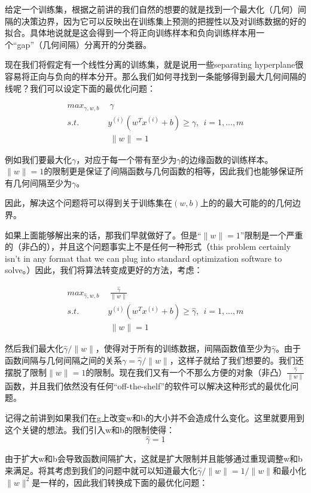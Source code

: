 \documentclass[UTF8]{ctexart}
\begin{document}
给定一个训练集，根据之前讲的我们自然的想要的就是找到一个最大化（几何）间隔的决策边界，因为它可以反映出在训练集上预测的把握性以及对训练数据的好的拟合。具体地说就是这会得到一个将正向训练样本和负向训练样本用一个“gap”（几何间隔）分离开的分类器。

现在我们将假定有一个线性分离的训练集，就是说用一些separating hyperplane很容易将正向与负向的样本分开。那么我们如何寻找到一条能够得到最大几何间隔的线呢？我们可以设定下面的最优化问题：

\begin{align*}
max_{\gamma,w,b} & \ \ \gamma\\
s.t. & \ y^{(i)}(w^{T}x^{(i)}+b) \geq \gamma,\ \ i=1,...,m\\
& \ \ \|w\|=1
\end{align*}


例如我们要最大化$\gamma$，对应于每一个带有至少为$\gamma$的边缘函数的训练样本。$\|w\|=1$的限制更是保证了间隔函数与几何函数的相等，因此我们也能够保证所有几何间隔至少为$\gamma$。




因此，解决这个问题将可以得到关于训练集在$(w,b)$上的的最大可能的的几何边界。

如果上面能够解出来的话，那我们早就做好了。但是“$\|w\|=1$”限制是一个严重的（非凸的），并且这个问题事实上不是任何一种形式（this problem certainly isn’t in any format that we can plug into standard optimization software to solve。）因此，我们将算法转变成更好的方法，考虑：



\begin{align*}
max_{\hat{\gamma},w,b} & \ \ \frac{\hat{\gamma}}{\|  w  \|}\\
s.t. & \ y^{(i)}(w^{T}x^{(i)}+b) \geq \hat{\gamma},\ \ i=1,...,m\\
& \ \ \|w\|=1
\end{align*}




然后我们最大化$\hat{\gamma}/\|w\|$，使得对于所有的训练数据，间隔函数值至少为$\hat{\gamma}$。由于函数间隔与几何间隔之间的关系$\gamma = \hat{\gamma}/\|w\|$，这样子就给了我们想要的。我们还摆脱了限制$\|w\|=1$的限制。现在我们又有一个不那么方便的对象（非凸）$\frac{\hat{\gamma}}{\|  w  \|}$函数，并且我们依然没有任何“off-the-shelf”的软件可以解决这种形式的最优化问题。

记得之前讲到如果我们在g上改变w和b的大小并不会造成什么变化。这里就要用到这个关键的想法。我们引入w和b的限制使得：\[\hat{\gamma} = 1 \]

由于扩大w和b会导致函数间隔扩大，这就是扩大限制并且能够通过重现调整w和b来满足。将其考虑到我们的问题中就可以知道最大化$\hat{\gamma}/\|w\|=1/\|w\|$和最小化$\|w\|^{2}$是一样的，因此我们转换成下面的最优化问题：
\end{document}
